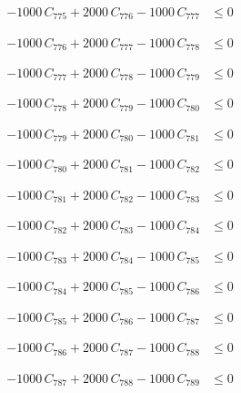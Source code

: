 \documentclass[a4paper,11pt]{article}
\begin{document}
\begin{align}
-1000\,C_{775} + 2000\,C_{776} - 1000\,C_{777} &\leq 0 \nonumber
\end{align}

\begin{align}
-1000\,C_{776} + 2000\,C_{777} - 1000\,C_{778} &\leq 0 \nonumber
\end{align}

\begin{align}
-1000\,C_{777} + 2000\,C_{778} - 1000\,C_{779} &\leq 0 \nonumber
\end{align}

\begin{align}
-1000\,C_{778} + 2000\,C_{779} - 1000\,C_{780} &\leq 0 \nonumber
\end{align}

\begin{align}
-1000\,C_{779} + 2000\,C_{780} - 1000\,C_{781} &\leq 0 \nonumber
\end{align}

\begin{align}
-1000\,C_{780} + 2000\,C_{781} - 1000\,C_{782} &\leq 0 \nonumber
\end{align}

\begin{align}
-1000\,C_{781} + 2000\,C_{782} - 1000\,C_{783} &\leq 0 \nonumber
\end{align}

\begin{align}
-1000\,C_{782} + 2000\,C_{783} - 1000\,C_{784} &\leq 0 \nonumber
\end{align}

\begin{align}
-1000\,C_{783} + 2000\,C_{784} - 1000\,C_{785} &\leq 0 \nonumber
\end{align}

\begin{align}
-1000\,C_{784} + 2000\,C_{785} - 1000\,C_{786} &\leq 0 \nonumber
\end{align}

\begin{align}
-1000\,C_{785} + 2000\,C_{786} - 1000\,C_{787} &\leq 0 \nonumber
\end{align}

\begin{align}
-1000\,C_{786} + 2000\,C_{787} - 1000\,C_{788} &\leq 0 \nonumber
\end{align}

\begin{align}
-1000\,C_{787} + 2000\,C_{788} - 1000\,C_{789} &\leq 0 \nonumber
\end{align}
\end{document}
